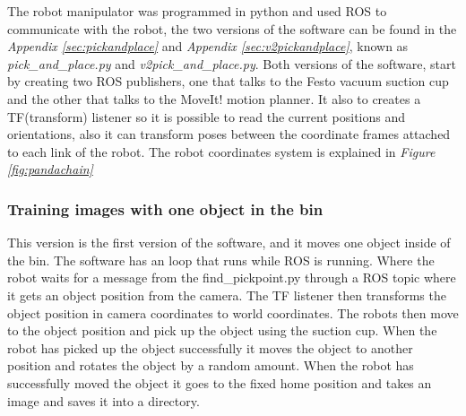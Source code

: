 The robot manipulator was programmed in python and used ROS to communicate with the robot, the two versions of the software can be found in the \textit{Appendix \ref{sec:pickandplace}} and \textit{Appendix \ref{sec:v2pickandplace}}, known as \textit{pick\_and\_place.py} and \textit{v2pick\_and\_place.py}. 
Both versions of the software, start by creating two ROS publishers, one that talks to the Festo vacuum suction cup and the other that talks to the MoveIt! motion planner. 
It also to creates a TF(transform) listener so it is possible to read the current positions and orientations, also it can transform poses between the coordinate frames attached to each link of the robot. The robot coordinates system is explained in \textit{Figure \ref{fig:pandachain}} 

\subsubsection{Training images with one object in the bin}\label{robotcontrol}
This version is the first version of the software, and it moves one object inside of the bin. The software has an loop that runs while ROS is running. 
Where the robot waits for a message from the find\_pickpoint.py through a ROS topic where it gets an object position from the camera.
The TF listener then transforms the object position in camera coordinates to world coordinates. The robots then move to the object position and pick up the object using the suction cup. When the robot has picked up the object successfully it moves the object to another position and rotates the object by a random amount. When the robot has successfully moved the object it goes to the fixed home position and takes an image and saves it into a directory. 

